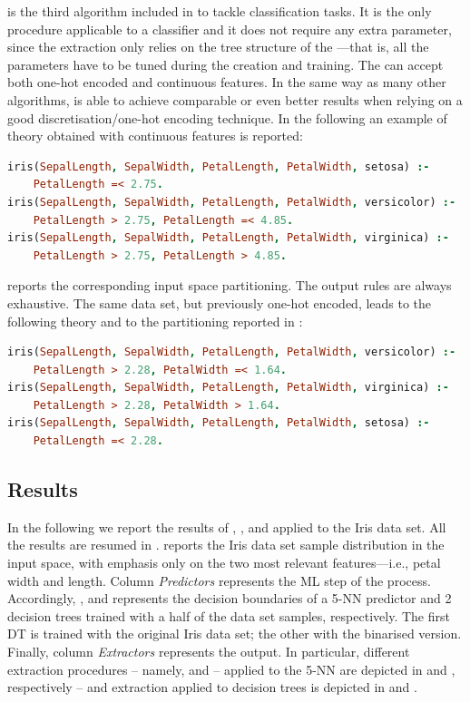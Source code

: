 \documentclass[12pt,a4paper,openright,twoside]{book}
\begin{document}
\cart{} is the third algorithm included in \psyke{} to tackle classification tasks.
%
It is the only procedure applicable to a  classifier and it does not require any extra parameter, since the extraction only relies on the tree structure of the ---that is, all the parameters have to be tuned during the  creation and training.
%
The  can accept both one-hot encoded and continuous features.
%
In the same way as many other algorithms, \cart{} is able to achieve comparable or even better results when relying on a good discretisation/one-hot encoding technique.
%
In the following an example of theory obtained with continuous features is reported:
%
\begin{lstlisting}[language=Prolog]
iris(SepalLength, SepalWidth, PetalLength, PetalWidth, setosa) :-
    PetalLength =< 2.75.
iris(SepalLength, SepalWidth, PetalLength, PetalWidth, versicolor) :-
    PetalLength > 2.75, PetalLength =< 4.85.
iris(SepalLength, SepalWidth, PetalLength, PetalWidth, virginica) :-
    PetalLength > 2.75, PetalLength > 4.85.
\end{lstlisting}
%
 reports the corresponding input space partitioning.
%
The output rules are always exhaustive.
%
The same data set, but previously one-hot encoded, leads to the following theory and to the partitioning reported in :
%
\begin{lstlisting}[language=Prolog]
iris(SepalLength, SepalWidth, PetalLength, PetalWidth, versicolor) :-
    PetalLength > 2.28, PetalWidth =< 1.64.
iris(SepalLength, SepalWidth, PetalLength, PetalWidth, virginica) :-
    PetalLength > 2.28, PetalWidth > 1.64.
iris(SepalLength, SepalWidth, PetalLength, PetalWidth, setosa) :-
    PetalLength =< 2.28.
\end{lstlisting}

\subsection{Results}



In the following we report the results of \real{}, \trepan{}, and \cart{} applied to the Iris data set.
%
All the results are resumed in .
%
 reports the Iris data set sample distribution in the input space, with emphasis only on the two most relevant features---i.e., petal width and length.
%
Column \textit{Predictors} represents the ML step of the process. Accordingly, ,  and  represents the decision boundaries of a 5-NN predictor and 2 decision trees trained with a half of the data set samples, respectively.
%
The first DT is trained with the original Iris data set; the other with the binarised version.
%
Finally, column \textit{Extractors} represents the \psyke{} output.
%
In particular, different extraction procedures -- namely, \real{} and \trepan{}  -- applied to the 5-NN are depicted in  and , respectively -- and \cart{} extraction applied to decision trees is depicted in  and .
\end{document}
